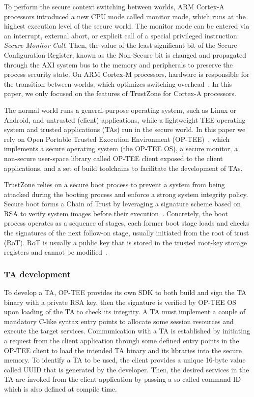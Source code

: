 To perform the secure context switching between worlds, ARM Cortex-A processors
introduced a new CPU mode called monitor mode, which runs at the highest
execution level of the secure world. The monitor mode can be entered via an
interrupt, external abort, or explicit call of a special privileged instruction:
\emph{Secure Monitor Call}. Then, the value of the least significant bit of the
Secure Configuration Register, known as the Non-Secure bit is changed and
propagated through the AXI system bus to the memory and peripherals to preserve
the process security state. On ARM Cortex-M processors, hardware is responsible
for the transition between worlds, which optimizes switching
overhead~\cite{Pinto2019DemystifyingAT, Ngabonziza2016TrustZoneEA}.  In this
paper, we only focused on the features of TrustZone for Cortex-A processors.

The normal world runs a general-purpose operating system, such as Linux or
Android, and untrusted (client) applications, while a lightweight TEE operating
system and trusted applications (TAs) run in the secure world. In this paper we
rely on Open Portable Trusted Execution Environment (OP-TEE)~\cite{OPTEE}, which
implements a secure operating system (the OP-TEE OS), a secure monitor, a
non-secure user-space library called OP-TEE client exposed to the client
applications, and a set of build toolchains to facilitate the development of
TAs.

TrustZone relies on a secure boot process to prevent a system from being
attacked during the booting process and enforce a strong system integrity
policy. Secure boot forms a Chain of Trust by leveraging a signature scheme
based on RSA to verify system images before their
execution~\cite{maene:hardware}. Concretely, the boot process operates
as a sequence of stages, each former boot stage loads and checks the signatures
of the next follow-on stage, usually initiated from the root of trust (RoT). RoT
is usually a public key that is stored in the trusted root-key storage registers
and cannot be modified~\cite{TBB}.

\subsubsection{TA development}

To develop a TA, OP-TEE provides its own SDK to both build and sign the TA
binary with a private RSA key, then the signature is verified by OP-TEE OS upon
loading of the TA to check its integrity. A TA must implement a couple of
mandatory C-like syntax entry points to allocate some session resources and
execute the target services. Communication with a TA is established by
initiating a request from the client application through some defined entry
points in the OP-TEE client to load the intended TA binary and its libraries
into the secure memory. To identify a TA to be used, the client provides a
unique 16-byte value called UUID that is generated by the developer. Then, the
desired services in the TA are invoked from the client application by passing a
so-called command ID which is also defined at compile time.

